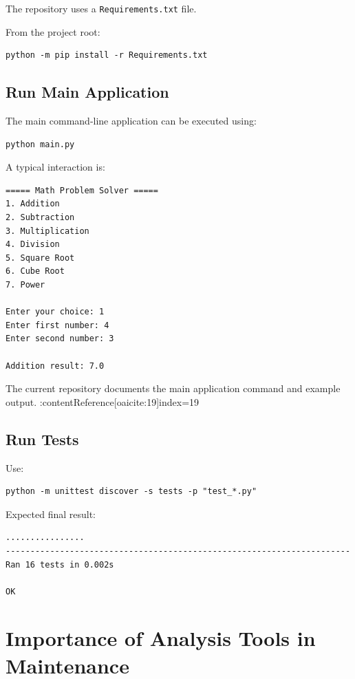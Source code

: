 \documentclass[12pt,a4paper]{report}
\begin{document}
The repository uses a \texttt{Requirements.txt} file.

From the project root:

\begin{lstlisting}
python -m pip install -r Requirements.txt
\end{lstlisting}

\section{Run Main Application}

The main command-line application can be executed using:

\begin{lstlisting}
python main.py
\end{lstlisting}

A typical interaction is:

\begin{lstlisting}
===== Math Problem Solver =====
1. Addition
2. Subtraction
3. Multiplication
4. Division
5. Square Root
6. Cube Root
7. Power

Enter your choice: 1
Enter first number: 4
Enter second number: 3

Addition result: 7.0
\end{lstlisting}

The current repository documents the main application command and
example output. :contentReference[oaicite:19]{index=19}

\section{Run Tests}

Use:

\begin{lstlisting}
python -m unittest discover -s tests -p "test_*.py"
\end{lstlisting}

Expected final result:

\begin{lstlisting}
................
----------------------------------------------------------------------
Ran 16 tests in 0.002s

OK
\end{lstlisting}


\chapter{Importance of Analysis Tools in Maintenance}
\end{document}

